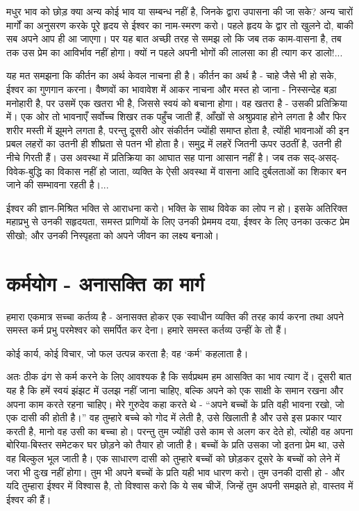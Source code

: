 मधुर भाव को छोड़ क्या अन्य कोई भाव या सम्बन्ध नहीं है, जिनके द्वारा उपासना की जा सके? अन्य चारों मार्गों का अनुसरण करके पूरे हृदय से ईश्वर का नाम-स्मरण करो। पहले हृदय के द्वार तो खुलने दो, बाकी सब अपने आप ही आ जाएगा। पर यह बात अच्छी तरह से समझ लो कि जब तक काम-वासना है, तब तक उस प्रेम का आविर्भाव नहीं होगा। क्यों न पहले अपनी भोगों की लालसा का ही त्याग कर डालो!... 

यह मत समझना कि कीर्तन का अर्थ केवल नाचना ही है। कीर्तन का अर्थ है - चाहे जैसे भी हो सके, ईश्वर का गुणगान करना। वैष्णवों का भावावेश में आकर नाचना और मस्त हो जाना - निस्सन्देह बड़ा मनोहारी है, पर उसमें एक खतरा भी है, जिससे स्वयं को बचाना होगा। वह खतरा है - उसकी प्रतिक्रिया में। एक ओर तो भावनाएँ सर्वोच्च शिखर तक पहुँच जाती हैं, आँखों से अश्रुप्रवाह होने लगता है और फिर शरीर मस्ती में झूमने लगता है, परन्तु दूसरी ओर संकीर्तन ज्योंही समाप्त होता है, त्योंही भावनाओं की इन प्रबल लहरों का उतनी ही शीघ्रता से पतन भी होता है। समुद्र में लहरें जितनी ऊपर उठतीं है, उतनी ही नीचे गिरती हैं। उस अवस्था में प्रतिक्रिया का आघात सह पाना आसान नहीं है। जब तक सद्-असद्-विवेक-बुद्धि का विकास नहीं हो जाता, व्यक्ति के ऐसी अवस्था में वासना आदि दुर्बलताओं का शिकार बन जाने की सम्भावना रहती है।... 

\newpage

ईश्वर की ज्ञान-मिश्रित भक्ति से आराधना करो। भक्ति के साथ विवेक का लोप न हो। इसके अतिरिक्त महाप्रभु से उनकी सहृदयता, समस्त प्राणियों के लिए उनकी प्रेममय दया, ईश्वर के लिए उनका उत्कट प्रेम सीखो; और उनकी निस्पृहता को अपने जीवन का लक्ष्य बनाओ।


\section*{कर्मयोग - अनासक्ति का मार्ग}


हमारा एकमात्र सच्चा कर्तव्य है - अनासक्त होकर एक स्वाधीन व्यक्ति की तरह कार्य करना तथा अपने समस्त कर्म प्रभु परमेश्वर को समर्पित कर देना। हमारे समस्त कर्तव्य उन्हीं के तो हैं। 

कोई कार्य, कोई विचार, जो फल उत्पन्न करता है; वह ‘कर्म’ कहलाता है। 

अतः ठीक ढंग से कर्म करने के लिए आवश्यक है कि सर्वप्रथम हम आसक्ति का भाव त्याग दें। दूसरी बात यह है कि हमें स्वयं झंझट में उलझ नहीं जाना चाहिए, बल्कि अपने को एक साक्षी के समान रखना और अपना काम करते रहना चाहिए। मेरे गुरुदेव कहा करते थे - “अपने बच्चों के प्रति वही भावना रखो, जो एक दासी की होती है।” वह तुम्हारे बच्चे को गोद में लेती है, उसे खिलाती है और उसे इस प्रकार प्यार करती है, मानो वह उसी का बच्चा हो। परन्तु तुम ज्योंही उसे काम से अलग कर देते हो, त्योंही वह अपना बोरिया-बिस्तर समेटकर घर छोड़ने को तैयार हो जाती है। बच्चों के प्रति उसका जो इतना प्रेम था, उसे वह बिल्कुल भूल जाती है। एक साधारण दासी को तुम्हारे बच्चों को छोड़कर दूसरे के बच्चों को लेने में जरा भी दुःख नहीं होगा। तुम भी अपने बच्चों के प्रति यही भाव धारण करो। तुम उनकी दासी हो - और यदि तुम्हारा ईश्वर में विश्वास है, तो विश्वास करो कि ये सब चीजें, जिन्हें तुम अपनी समझते हो, वास्तव में ईश्वर की हैं। 


